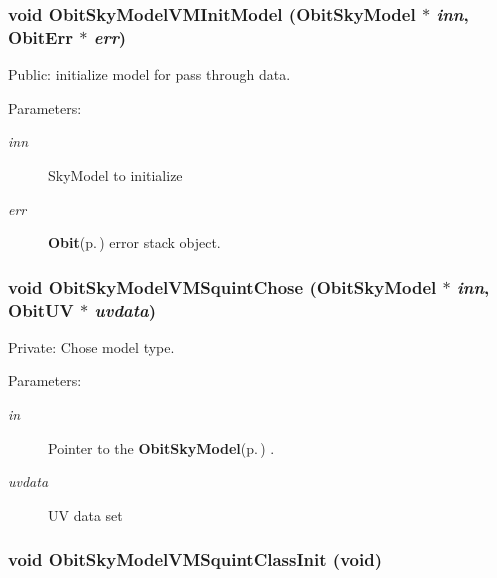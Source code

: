 \subsubsection{\setlength{\rightskip}{0pt plus 5cm}void Obit\-Sky\-Model\-VMInit\-Model ({\bf Obit\-Sky\-Model} $\ast$ {\em inn}, {\bf Obit\-Err} $\ast$ {\em err})}\label{ObitSkyModelVMSquint_8h_a9}


Public: initialize model for pass through data. 

\begin{Desc}
\item[Parameters:]
\begin{description}
\item[{\em inn}]Sky\-Model to initialize \item[{\em err}]{\bf Obit}{\rm (p.\,\pageref{structObit})} error stack object. \end{description}
\end{Desc}
\subsubsection{\setlength{\rightskip}{0pt plus 5cm}void Obit\-Sky\-Model\-VMSquint\-Chose ({\bf Obit\-Sky\-Model} $\ast$ {\em inn}, {\bf Obit\-UV} $\ast$ {\em uvdata})}\label{ObitSkyModelVMSquint_8h_a14}


Private: Chose model type. 

\begin{Desc}
\item[Parameters:]
\begin{description}
\item[{\em in}]Pointer to the {\bf Obit\-Sky\-Model}{\rm (p.\,\pageref{structObitSkyModel})} . \item[{\em uvdata}]UV data set \end{description}
\end{Desc}
\subsubsection{\setlength{\rightskip}{0pt plus 5cm}void Obit\-Sky\-Model\-VMSquint\-Class\-Init (void)}\label{ObitSkyModelVMSquint_8h_a3}


